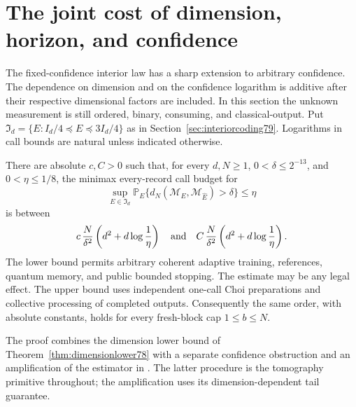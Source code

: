 \section{The joint cost of dimension, horizon, and confidence}
\label{sec:confidencelearning80}

The fixed-confidence interior law has a sharp extension to arbitrary
confidence.  The dependence on dimension and on the confidence
logarithm is additive after their respective dimensional factors are
included.  In this section the unknown measurement is still ordered,
binary, consuming, and classical-output.  Put
$\mathfrak I_d=\{E:I_d/4\preceq E\preceq3I_d/4\}$ as in
Section~\ref{sec:interiorcoding79}.  Logarithms in call bounds are
natural unless indicated otherwise.

\begin{theorem}
\label{thm:interiorconfidence80}
There are absolute $c,C>0$ such that, for every $d,N\ge1$,
$0<\delta\le2^{-13}$, and $0<\eta\le1/8$, the minimax
every-record call budget for
\begin{equation}\label{eq:interiorconfidencerisk80}
 \sup_{E\in\mathfrak I_d}
 \mathbb P_E\{d_N(\mathcal M_E,\mathcal M_{\widehat E})>\delta\}
 \le\eta
\end{equation}
is between
\begin{equation}\label{eq:interiorconfidence80}
 c\,\frac{N}{\delta^2}
       \left(d^2+d\log\frac1\eta\right)
 \quad\hbox{and}\quad
 C\,\frac{N}{\delta^2}
       \left(d^2+d\log\frac1\eta\right).
\end{equation}
The lower bound permits arbitrary coherent adaptive training,
references, quantum memory, and public bounded stopping.  The estimate
may be any legal effect.  The upper bound uses independent one-call
Choi preparations and collective processing of completed outputs.
Consequently the same order, with absolute constants, holds for
every fresh-block cap $1\le b\le N$.
\end{theorem}

The proof combines the dimension lower bound of
Theorem~\ref{thm:dimensionlower78} with a separate confidence
obstruction and an amplification of the estimator in \cite{MB67}.
The latter procedure is the tomography primitive throughout; the
amplification uses its dimension-dependent tail guarantee.

